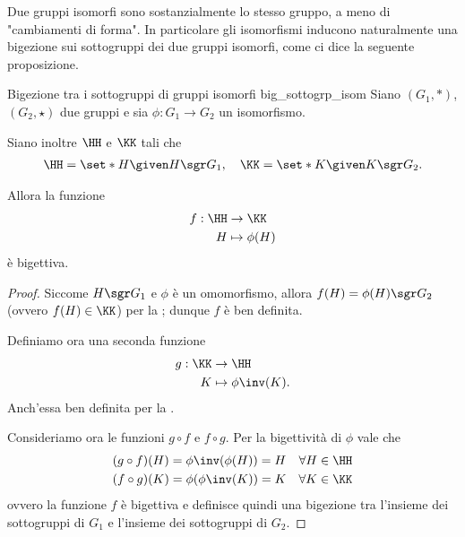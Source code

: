 Due gruppi isomorfi sono sostanzialmente lo stesso gruppo, a meno di "cambiamenti di forma". In particolare gli isomorfismi inducono naturalmente una bigezione sui sottogruppi dei due gruppi isomorfi, come ci dice la seguente proposizione.

\begin{proposition}
    {Bigezione tra i sottogruppi di gruppi isomorfi} {big_sottogrp_isom}
    Siano $(G_1, *)$, $(G_2, \star)$ due gruppi e sia $\phi : G_1 \to G_2$ un isomorfismo.

    Siano inoltre $\HH$ e $\KK$ tali che \begin{align*}
        \HH = \set*{H \given H \sgr G_1}, \quad \KK = \set*{K \given K \sgr G_2}.
    \end{align*}

    Allora la funzione \begin{align*}
        f : \HH &\to \KK \\
        H &\mapsto \phi(H)
    \end{align*} è bigettiva.
\end{proposition}
\begin{proof}
    Siccome $H \sgr G_1$ e $\phi$ è un omomorfismo, allora $f(H) = \phi(H) \sgr G_2$ (ovvero $f(H) \in \KK$) per la ; dunque $f$ è ben definita.

    Definiamo ora una seconda funzione \begin{align*}
        g : \KK &\to \HH\\
        K &\mapsto \phi\inv(K).
    \end{align*} Anch'essa ben definita per la .

    Consideriamo ora le funzioni $g \circ f$ e $f \circ g$. Per la bigettività di $\phi$ vale che \begin{align*}
        &(g \circ f)(H) = \phi\inv(\phi(H)) = H &\forall H \in \HH\\
        &(f \circ g)(K) = \phi(\phi\inv(K)) = K &\forall K \in \KK
    \end{align*} ovvero la funzione $f$ è bigettiva e definisce quindi una bigezione tra l'insieme dei sottogruppi di $G_1$ e l'insieme dei sottogruppi di $G_2$.
\end{proof}

